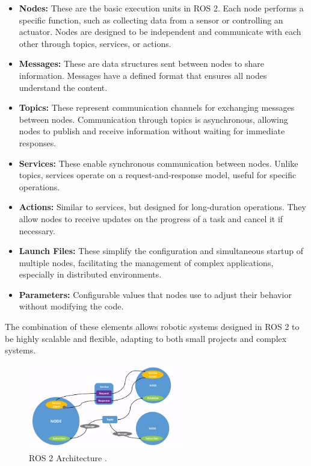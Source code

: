     \begin{itemize}
        \item \textbf{Nodes:} These are the basic execution units in ROS 2. Each node performs a specific function, such as collecting data from a sensor or controlling an actuator. Nodes are designed to be independent and communicate with each other through topics, services, or actions.  
        \item \textbf{Messages:} These are data structures sent between nodes to share information. Messages have a defined format that ensures all nodes understand the content.  
        \item \textbf{Topics:} These represent communication channels for exchanging messages between nodes. Communication through topics is asynchronous, allowing nodes to publish and receive information without waiting for immediate responses.  
        \item \textbf{Services:} These enable synchronous communication between nodes. Unlike topics, services operate on a request-and-response model, useful for specific operations.  
        \item \textbf{Actions:} Similar to services, but designed for long-duration operations. They allow nodes to receive updates on the progress of a task and cancel it if necessary.  
        \item \textbf{Launch Files:} These simplify the configuration and simultaneous startup of multiple nodes, facilitating the management of complex applications, especially in distributed environments.  
        \item \textbf{Parameters:} Configurable values that nodes use to adjust their behavior without modifying the code.  
    \end{itemize}
    
    The combination of these elements allows robotic systems designed in ROS 2 to be highly scalable and flexible, adapting to both small projects and complex systems.  
    
    \begin{figure}[h!]
        \centering
        \includegraphics[width=0.6\textwidth]{pictures/ros2_arch.png}
        \caption{ROS 2 Architecture \cite{ros_docs}.}
        \label{fig:ros2_architecture}
    \end{figure}
    
